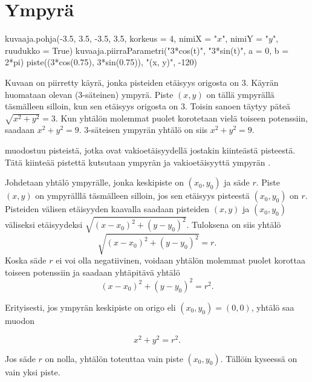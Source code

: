 \section{Ympyrä}


\begin{kuva}
    kuvaaja.pohja(-3.5, 3.5, -3.5, 3.5, korkeus = 4, nimiX = "$x$", nimiY = "$y$", ruudukko = True)
    kuvaaja.piirraParametri("3*cos(t)", "3*sin(t)", a = 0, b = 2*pi)
    piste((3*cos(0.75), 3*sin(0.75)), "(x, y)", -120)
\end{kuva}

Kuvaan on piirretty käyrä, jonka pisteiden etäisyys origosta on 3. Käyrän huomataan olevan ($3$-säteinen) ympyrä. Piste $(x, y)$ on tällä ympyrällä täsmälleen silloin, kun sen etäisyys origosta on 3. Toisin sanoen täytyy päteä $\sqrt{x^2+y^2}=3$. Kun yhtälön molemmat puolet korotetaan vielä toiseen potenssiin, saadaan $x^2+y^2=9$. $3$-säteisen ympyrän yhtälö on siis $x^2+y^2=9$.

 muodostuu pisteistä, jotka ovat vakioetäisyydellä jostakin kiinteästä pisteestä. Tätä kiinteää pistettä kutsutaan ympyrän  ja vakioetäisyyttä ympyrän .

Johdetaan yhtälö ympyrälle, jonka keskipiste on $(x_0, y_0)$ ja säde $r$. Piste $(x, y)$ on ympyrälllä täsmälleen silloin, jos sen etäisyys pisteestä $(x_0, y_0)$ on $r$. Pisteiden välisen etäisyyden kaavalla saadaan pisteiden $(x, y)$ ja $(x_0, y_0)$ väliseksi etäisyydeksi $\sqrt{(x-x_0)^2+(y-y_0)^2}$. Tuloksena on siis yhtälö
\[
\sqrt{(x-x_0)^2+(y-y_0)^2}=r.
\]
Koska säde $r$ ei voi olla negatiivinen, voidaan yhtälön molemmat puolet korottaa toiseen potenssiin ja saadaan yhtäpitävä yhtälö
\[
(x-x_0)^2+(y-y_0)^2=r^2.
\]

Erityisesti, jos ympyrän keskipiste on origo eli $(x_{0}, y_{0})= (0, 0)$, yhtälö saa muodon

\[
x^{2}+y^{2} = r^{2}.
\]


Jos säde $r$ on nolla, yhtälön toteuttaa vain piste $(x_{0}, y_{0})$. Tällöin kyseessä on vain yksi piste.

